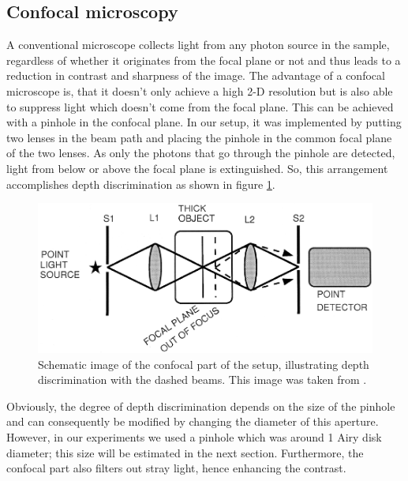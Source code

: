 \documentclass[12pt,a4paper]{article}
\begin{document}
\subsection{Confocal microscopy}
A conventional microscope collects light from any photon source in the sample, regardless of whether it originates from the focal plane or not and thus leads to a reduction in contrast and sharpness of the image. The advantage of a confocal microscope is, that it doesn't only achieve a high 2-D resolution but is also able to suppress light which doesn't come from the focal plane. This can be achieved with a pinhole in the confocal plane. In our setup, it was implemented by putting two lenses in the beam path and placing the pinhole in the common focal plane of the two lenses. As only the photons that go through the pinhole are detected, light from below or above the focal plane is extinguished. So, this arrangement accomplishes depth discrimination as shown in figure \ref{cmz}.
\begin{figure}[H]
\centering
\includegraphics[scale=0.4]{cmzfocus.png} 
\caption{Schematic image of the confocal part of the setup, illustrating depth discrimination with the dashed beams. This image was taken from \cite{cmmem}.}
\label{cmz}
\end{figure}
Obviously, the degree of depth discrimination depends on the size of the pinhole and can consequently be modified by changing the diameter of this aperture. However, in our experiments we used a pinhole which was around 1 Airy disk diameter; this size will be estimated in the next section. Furthermore, the confocal part also filters out stray light, hence enhancing the contrast\cite{czj}.
\\
\end{document}
